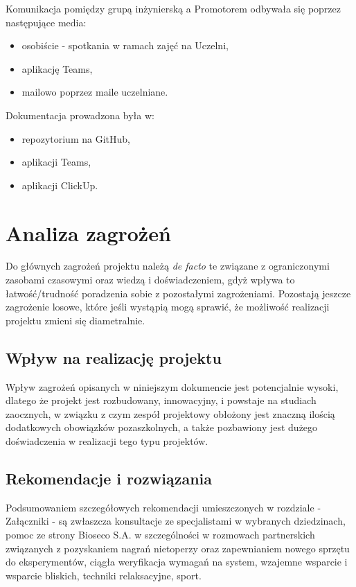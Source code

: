 \documentclass{sprz}
\begin{document}
  Komunikacja pomiędzy grupą inżynierską a Promotorem odbywała się poprzez następujące media:
\begin{itemize}
  \item{osobiście - spotkania w ramach zajęć na Uczelni,}
  \item{aplikację Teams,}
  \item{mailowo poprzez maile uczelniane.}
  \end{itemize}

Dokumentacja prowadzona była w:
\begin{itemize}
  \item{repozytorium na GitHub,}
  \item{aplikacji Teams,}
  \item{aplikacji ClickUp.}
  \end{itemize}

\section{Analiza zagrożeń}

Do głównych zagrożeń projektu należą \textit{de facto} te związane z ograniczonymi zasobami czasowymi oraz wiedzą i doświadczeniem, gdyż wpływa to łatwość/trudność poradzenia sobie z pozostałymi zagrożeniami. Pozostają jeszcze zagrożenie losowe, które jeśli wystąpią mogą sprawić, że możliwość realizacji projektu zmieni się diametralnie.

\subsection{Wpływ na realizację projektu}
Wpływ zagrożeń opisanych w niniejszym dokumencie jest potencjalnie wysoki, dlatego że projekt jest rozbudowany, innowacyjny, i powstaje na studiach zaocznych, w związku z czym zespół projektowy obłożony jest znaczną ilością dodatkowych obowiązków pozaszkolnych, a także pozbawiony jest dużego doświadczenia w realizacji tego typu projektów.

\subsection{Rekomendacje i rozwiązania}
Podsumowaniem szczegółowych rekomendacji umieszczonych w rozdziale - Załączniki - są zwłaszcza konsultacje ze specjalistami w wybranych dziedzinach, pomoc ze strony Bioseco S.A. w szczególności w rozmowach partnerskich związanych z pozyskaniem nagrań nietoperzy oraz zapewnianiem nowego sprzętu do eksperymentów, ciągła weryfikacja wymagań na system, wzajemne wsparcie i wsparcie bliskich, techniki relaksacyjne, sport.
\end{document}
